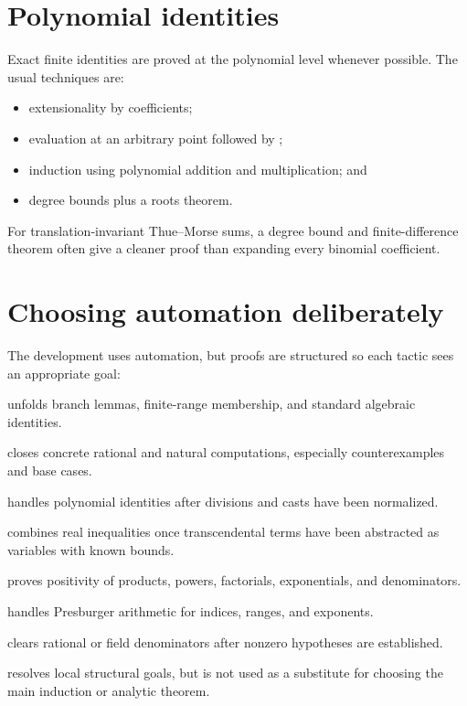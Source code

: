 \documentclass[11pt,oneside]{report}
\theoremstyle{definition}
\theoremstyle{remark}
\DeclareRobustCommand{\lean}[1]{\texorpdfstring{\texttt{\expandafter\seqsplit\expandafter{\detokenize{#1}}}}{\detokenize{#1}}}
\begin{document}
\section{Polynomial identities}
Exact finite identities are proved at the polynomial level whenever possible.  The usual techniques are:
\begin{itemize}
  \item extensionality by coefficients;
  \item evaluation at an arbitrary point followed by \lean{ring};
  \item induction using polynomial addition and multiplication; and
  \item degree bounds plus a roots theorem.
\end{itemize}
For translation-invariant Thue--Morse sums, a degree bound and finite-difference theorem often give a cleaner proof than expanding every binomial coefficient.

\section{Choosing automation deliberately}
The development uses automation, but proofs are structured so each tactic sees an appropriate goal:
\begin{description}[style=nextline,leftmargin=2.5em]
  \item[\lean{simp}] unfolds branch lemmas, finite-range membership, and standard algebraic identities.
  \item[\lean{norm_num}] closes concrete rational and natural computations, especially counterexamples and base cases.
  \item[\lean{ring} / \lean{ring_nf}] handles polynomial identities after divisions and casts have been normalized.
  \item[\lean{linarith} / \lean{nlinarith}] combines real inequalities once transcendental terms have been abstracted as variables with known bounds.
  \item[\lean{positivity}] proves positivity of products, powers, factorials, exponentials, and denominators.
  \item[\lean{omega}] handles Presburger arithmetic for indices, ranges, and exponents.
  \item[\lean{field_simp}] clears rational or field denominators after nonzero hypotheses are established.
  \item[\lean{aesop}] resolves local structural goals, but is not used as a substitute for choosing the main induction or analytic theorem.
\end{description}
\end{document}
